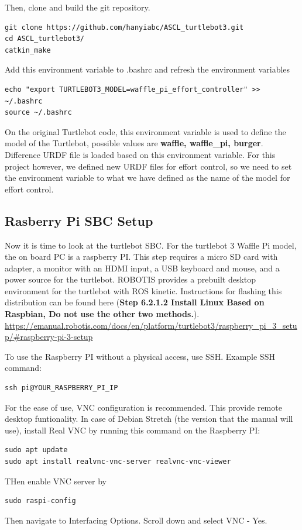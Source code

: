 \documentclass[12]{article}
\begin{document}
Then, clone and build the git repository. 
\begin{lstlisting}[style=bash]
git clone https://github.com/hanyiabc/ASCL_turtlebot3.git
cd ASCL_turtlebot3/
catkin_make
\end{lstlisting}

Add this environment variable to .bashrc and refresh the environment variables
\begin{lstlisting}[style=bash]
echo "export TURTLEBOT3_MODEL=waffle_pi_effort_controller" >> ~/.bashrc
source ~/.bashrc
\end{lstlisting}
On the original Turtlebot code, this environment variable is used to define the model of the Turtlebot, possible values are \textbf{waffle, waffle\_pi, burger}. 
Difference URDF file is loaded based on this environment variable. 
For this project however, we defined new URDF files for effort control, so we need to set the environment variable to what we have defined as the name of the model for effort control. 
\subsection{Rasberry Pi SBC Setup}

Now it is time to look at the turtlebot SBC. For the turtlebot 3 Waffle Pi model, the on board PC is a raspberry PI. 
This step requires a micro SD card with adapter, a monitor with an HDMI input, a USB keyboard and mouse, and a power source for the turtlebot. 
ROBOTIS provides a prebuilt desktop environment for the turtlebot with ROS kinetic. Instructions for flashing this distribution can be found here (\textbf{Step 6.2.1.2 Install Linux Based on Raspbian, Do not use the other two methods.}).\\
\url {https://emanual.robotis.com/docs/en/platform/turtlebot3/raspberry_pi_3_setup/#raspberry-pi-3-setup}

To use the Raspberry PI without a physical access, use SSH. Example SSH command:

\begin{lstlisting}[style=bash]
ssh pi@YOUR_RASPBERRY_PI_IP
\end{lstlisting}

For the ease of use, VNC configuration is recommended. This provide remote desktop funtionality. In case of Debian Stretch (the version that the manual will use), install Real VNC by running this command on the Raspberry PI:
\begin{lstlisting}[style=bash]
sudo apt update
sudo apt install realvnc-vnc-server realvnc-vnc-viewer
\end{lstlisting}
THen enable VNC server by 
\begin{lstlisting}[style=bash]
sudo raspi-config
\end{lstlisting}
Then navigate to Interfacing Options.
Scroll down and select VNC - Yes.
\end{document}
